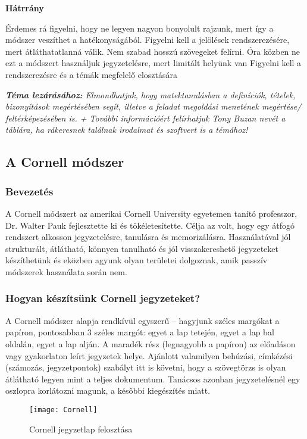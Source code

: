 \documentclass[../Main.tex]{subfiles}
\begin{document}
\textbf{Hátrrány}

Érdemes rá figyelni, hogy ne legyen nagyon bonyolult rajzunk, mert így a módszer veszíthet a hatékonyságából.
Figyelni kell a jelölések rendszerezésére, mert átláthatatlanná válik.
Nem szabad hosszú szövegeket felírni.
Óra közben ne ezt a módszert használjuk jegyzetelésre, mert limitált helyünk van
Figyelni kell a rendszerezésre és a témák megfelelő elosztására

\textit{\textbf{Téma lezárásához:} Elmondhatjuk, hogy matektanulásban a definíciók, tételek, bizonyítások megértésében segít, illetve a feladat megoldási menetének megértése/ feltérképezésében is.
+ További információért felírhatjuk Tony Buzan nevét a táblára, ha rákeresnek találnak irodalmat és szoftvert is a témához!}

\subsection{A Cornell módszer}

\subsubsection{Bevezetés}


A Cornell módszert az amerikai Cornell University egyetemen tanító professzor, Dr.
Walter Pauk fejlesztette ki és tökéletesítette. Célja az volt, hogy egy átfogó rendszert
alkosson jegyzetelésre, tanulásra és memorizálásra. Használatával jól strukturált,
átlátható, könnyen tanulható és jól visszakereshető jegyzeteket készíthetünk és eközben
agyunk olyan területei dolgoznak, amik passzív módszerek használata során nem.


\subsubsection{Hogyan készítsünk Cornell jegyzeteket?}

A Cornell módszer alapja rendkívül
egyszerű – hagyjunk széles margókat a
papíron, pontosabban 3 széles margót: egyet a
lap tetején, egyet a lap bal oldalán, egyet a lap
alján. A maradék rész (legnagyobb a papíron)
az előadáson vagy gyakorlaton leírt jegyzetek
helye. Ajánlott valamilyen behúzási,
címkézési (számozás, jegyzetpontok) szabályt
itt is követni, hogy a szövegtörzs is olyan
átlátható legyen mint a teljes dokumentum.
Tanácsos azonban jegyzetelésnél egy oszlopra
korlátozni magunk, a későbbi kiegészítés
miatt.

\begin{wrapfigure}{r}{0.5\textwidth}
    \centering
    \texttt{[image: Cornell]}
    \caption{Cornell jegyzetlap felosztása}
\end{wrapfigure}
    
\end{document}
